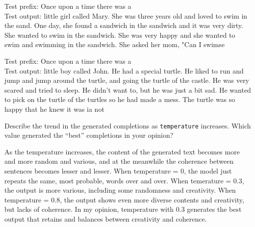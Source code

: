 \documentclass[11pt,addpoints,answers]{exam}
\begin{document}
\begin{questions}
\begin{parts}
\begin{subparts}
    \begin{your_solution}[title=\texttt{Temperature = 0.3}, height=3cm]
        \small
		Test prefix: Once upon a time there was a \\
		Test output: little girl called Mary. She was three years old and loved to swim in the sand. One day, she found a sandwich in the sandwich and it was very dirty. She wanted to swim in the sandwich. She was very happy and she wanted to swim and swimming in the sandwich. She asked her mom, "Can I swimse        
    \end{your_solution}
    
    \begin{your_solution}[title=\texttt{Temperature = 0.8}, height=3cm]
        \small
		Test prefix: Once upon a time there was a \\
		Test output: little boy called John. He had a special turtle. He liked to run and jump and jump around the turtle, and going the turtle of the castle. He was very scared and tried to sleep. He didn't want to, but he was just a bit sad. He wanted to pick on the turtle of the turtles so he had made a mess. The turtle was so happy that he knew it was ia not
    \end{your_solution}


    \clearpage
    \subpart[1]Describe the trend in the generated completions as \texttt{temperature} increases. Which value generated the ``best'' completions in your opinion?

    \begin{your_solution}[height=4cm]
        \small
        As the temperature increases, the content of the generated text becomes more and more random and various, and at the meanwhile the coherence between sentences becomes lesser and lesser. When temperature = 0, the model just repeats the same, most probable, words over and over. When temerature = 0.3, the output is more various, including some randomness and creativity. When temperature = 0.8, the output shows even more diverse contents and creativity, but lacks of coherence. In my opinion, temperature with 0.3 generates the best output that retains and balances between creativity and coherence.
    \end{your_solution}
\end{subparts}

\end{parts}
    \newpage
    \end{questions}
\newpage
\end{document}
